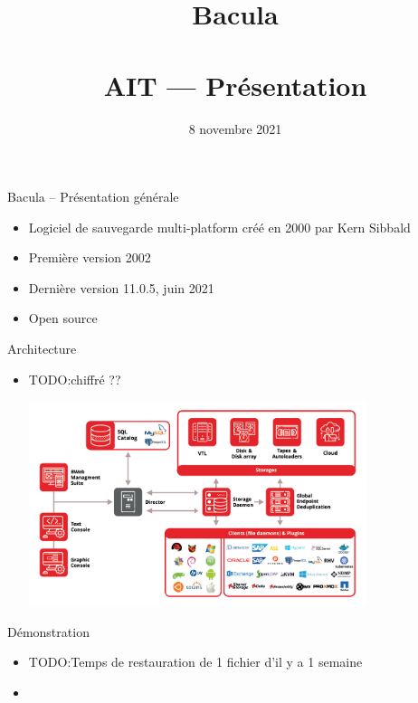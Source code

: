 \documentclass[aspectratio=169]{beamer}
\title{Bacula\\~\\AIT --- Présentation}
\date{8 novembre 2021}
\newcommand{\TODO}{TODO:}
\begin{document}
\begin{frame}
  \titlepage
\end{frame}

\begin{frame}{Bacula -- Présentation générale}
 \begin{itemize}
  \item Logiciel de sauvegarde multi-platform créé en 2000 par Kern Sibbald
  \item Première version 2002
  \item Dernière version 11.0.5, juin 2021
  \item Open source
 \end{itemize}
\end{frame}

\begin{frame}{Architecture}
 \begin{itemize}
  \item \TODO chiffré ??
  \begin{center}
  \includegraphics[height=60mm]{architecture.png}
   
  \end{center}

  
 \end{itemize}
\end{frame}

\begin{frame}{Démonstration}
 \begin{itemize}
  \item \TODO Temps de restauration de 1 fichier d'il y a 1 semaine
  \item 
 \end{itemize}
\end{frame}
\end{document}

